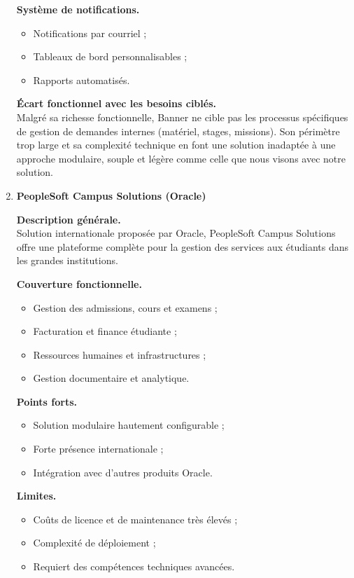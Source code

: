 \begin{enumerate}[label=\alph*)]
\textbf{Système de notifications.}
\begin{itemize}
\item Notifications par courriel ;
\item Tableaux de bord personnalisables ;
\item Rapports automatisés.
\end{itemize}

\textbf{Écart fonctionnel avec les besoins ciblés.} \\
Malgré sa richesse fonctionnelle, Banner ne cible pas les processus spécifiques de gestion de demandes internes (matériel, stages, missions). Son périmètre trop large et sa complexité technique en font une solution inadaptée à une approche modulaire, souple et légère comme celle que nous visons avec notre solution.

\item \textbf{PeopleSoft Campus Solutions (Oracle)}

\textbf{Description générale.} \\
Solution internationale proposée par Oracle, PeopleSoft Campus Solutions offre une plateforme complète pour la gestion des services aux étudiants dans les grandes institutions.

\textbf{Couverture fonctionnelle.}
\begin{itemize}
\item Gestion des admissions, cours et examens ;
\item Facturation et finance étudiante ;
\item Ressources humaines et infrastructures ;
\item Gestion documentaire et analytique.
\end{itemize}

\textbf{Points forts.}
\begin{itemize}
\item Solution modulaire hautement configurable ;
\item Forte présence internationale ;
\item Intégration avec d'autres produits Oracle.
\end{itemize}

\textbf{Limites.}
\begin{itemize}
\item Coûts de licence et de maintenance très élevés ;
\item Complexité de déploiement ;
\item Requiert des compétences techniques avancées.
\end{itemize}


\end{enumerate}
